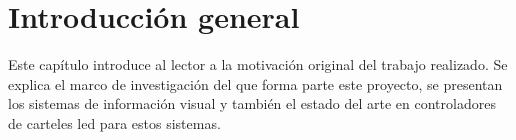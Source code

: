 
\newcommand{\keyword}[1]{\textbf{#1}}
\newcommand{\tabhead}[1]{\textbf{#1}}
\newcommand{\code}[1]{\texttt{#1}}
\newcommand{\file}[1]{\texttt{\bfseries#1}}
\newcommand{\option}[1]{\texttt{\itshape#1}}
\newcommand{\grados}{$^{\circ}$}



\chapter{Introducción general} %
\label{Chapter1} %
\label{Intro}

Este capítulo introduce al lector a la motivación original del trabajo realizado. Se explica el marco de investigación del que forma parte este proyecto, se presentan los sistemas de información visual y también el estado del arte en controladores de carteles led para estos sistemas.\\

  


%
%
%


